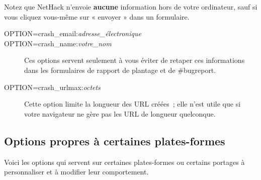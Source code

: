 \documentclass[titlepage]{article}
\begin{document}
Notez que NetHack n'envoie \textbf{aucune} information hors de votre
ordinateur, sauf si vous cliquez vous-même sur « envoyer » dans un
formulaire.

\begin{description}
\item[{OPTION=crash\_email:\textit{adresse\_électronique}}]

\item[{OPTION=crash\_name:\textit{votre\_nom}}]
Ces options servent seulement à vous éviter de retaper ces informations
dans les formulaires de rapport de plantage et de \#bugreport.

\item[{OPTION=crash\_urlmax:\textit{octets}}]
Cette option limite la longueur des URL créées~; elle n'est utile que si
votre navigateur ne gère pas les URL de longueur quelconque.

\end{description}
\subsection{Options propres à certaines plates-formes}



Voici les options qui servent sur certaines plates-formes ou certains
portages à personnaliser et à modifier leur comportement.
\end{document}
